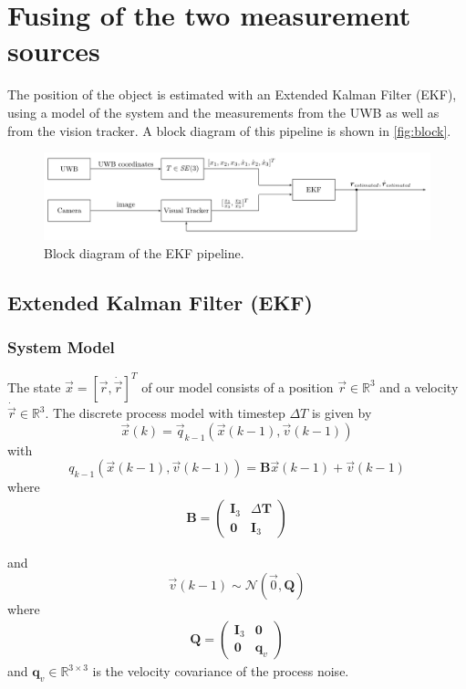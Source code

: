 \chapter{Fusing of the two measurement sources}\label{ch:fusing}

The position of the object is estimated with an Extended Kalman Filter (EKF), using a model of the system and the measurements from the UWB as well as from the vision tracker. A block diagram of this pipeline is shown in \autoref{fig:block}.

\begin{figure}[h]\centering
	\includegraphics[width=1.0\textwidth]{figures/blockdiagram_setup}
	\caption{Block diagram of the EKF pipeline.}\label{fig:block}
\end{figure}

\section{Extended Kalman Filter (EKF)}

\subsection{System Model}
The state $\vec x = [\vec r, \dot{\vec{r}}]^T$ of our model consists of a position $\vec r \in \mathbb{R}^3$ and a velocity $\dot{\vec r} \in \mathbb{R}^3$.
The discrete process model with timestep $\Delta T$ is given by
\begin{equation}
	\vec x(k) = \vec q_{k-1}(\vec x(k-1), \vec v(k-1))
\end{equation}
with
\begin{equation}
  q_{k-1}(\vec x(k-1), \vec v(k-1)) = \textbf{B} \vec x(k-1) + \vec v(k-1)
\end{equation}
where 
\begin{align}
	\textbf{B} =
	\begin{pmatrix}
		\textbf{I}_3 & \Delta \textbf{T}\\
		\textbf{0} & \textbf{I}_3
	\end{pmatrix}
\end{align} 

and
\begin{equation}
	\vec v(k-1) \sim \mathcal{N}(\vec 0, \textbf{Q})
\end{equation}
where
\begin{align}
	\textbf{Q} =
	\begin{pmatrix}
		\textbf{I}_3 & \textbf{0}\\
		\textbf{0} & \textbf{q}_v
	\end{pmatrix}
\end{align}
and $\textbf{q}_v \in \mathbb{R}^{3\times3}$ is the velocity covariance of the process noise.

